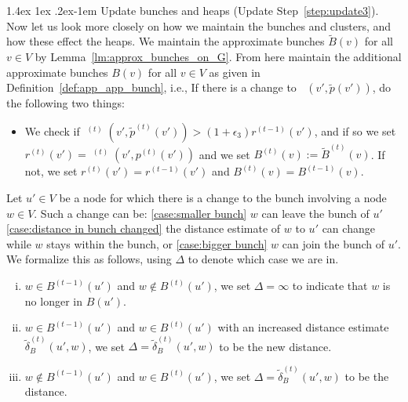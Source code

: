 \documentclass[11pt]{article}
\makeatletter
\theoremstyle{definition}
\theoremstyle{remark}
\DeclareMathOperator{\dLNbunch}{\delta_{\tilde{B}}}
\renewcommand{\paragraph}{%
  \@startsection{paragraph}{4}%
  {\z@}{1.4ex \@plus 1ex \@minus .2ex}{-1em}%
  {\normalfont\normalsize\bfseries}%
}
\makeatother
\begin{document}
\paragraph{Update bunches and heaps (Update Step~\ref{step:update3}).}
Now let us look more closely on how we maintain the bunches and clusters, and how these effect the heaps. We maintain the approximate bunches $\tilde B(v)$ for all $v\in V$ by Lemma~\ref{lm:approx_bunches_on_G}. From here maintain the additional approximate bunches $B(v)$ for all $v\in V$ as given in Definition~\ref{def:app_app_bunch}, i.e., 
If there is a change to $\dLNbunch(v',\tilde p(v'))$, do the following two things:\label{step:update_pivots}
    \begin{itemize}
        \item We check if $\dLNbunch^{(t)}(v',\tilde p^{(t)}(v'))> (1+\epsilon_3)r^{(t-1)}(v')$, and if so we set $r^{(t)}(v')=\dLNbunch^{(t)}(v',p^{(t)}(v'))$ and we set $B^{(t)}(v):=\tilde B^{(t)}(v)$. If not, we set $r^{(t)}(v')=r^{(t-1)}(v')$ and $B^{(t)}(v)=B^{(t-1)}(v)$.
    \end{itemize}
 Let $u'\in V$ be a node for which there is a change to the bunch involving a node $w\in V$. Such a change can be: \ref{case:smaller bunch} $w$ can leave the bunch of $u'$ \ref{case:distance in bunch changed} the distance estimate of $w$ to $u'$ can change while $w$ stays within the bunch, or \ref{case:bigger bunch} $w$ can join the bunch of $u'$. We formalize this as follows, using $\Delta$ to denote which case we are in.
    \begin{enumerate}[(i)]
        \item $w\in B^{(t-1)}(u')$ and $w\notin B^{(t)}(u')$, we set $\Delta=\infty$ to indicate that $w$ is no longer in $B(u')$. \label{case:smaller bunch}
        \item $w\in B^{(t-1)}(u')$ and $w\in B^{(t)}(u')$ with an increased distance estimate $\tilde \delta_B^{(t)}(u',w)$, we set $\Delta=\tilde \delta_B^{(t)}(u',w)$ to be the new distance. \label{case:distance in bunch changed}
        \item \label{case:bigger bunch} $w\notin B^{(t-1)}(u')$ and $w\in B^{(t)}(u')$, we set $\Delta=\tilde \delta_B^{(t)}(u',w)$ to be the distance. 
    \end{enumerate}
        
    
    
\end{document}
